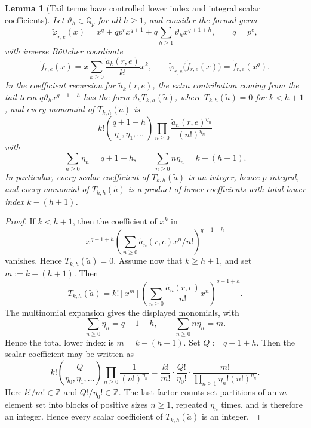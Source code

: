 \documentclass[11pt]{amsart}
\numberwithin{equation}{section}
\newtheorem{lemma}[lemma]{Lemma}
\newcommand{\Qp}{\mathbb{Q}_p}
\begin{document}
\begin{lemma}[Tail terms have controlled lower index and integral scalar coefficients]\label{lem:tail-structure}
Let $\vartheta_h\in\Qp$ for all $h\ge1$, and consider the formal germ
\[
        \widetilde\varphi_{r,e}(x)=x^q+qp^r x^{q+1}+q\sum_{h\ge1}\vartheta_h x^{q+1+h},
        \qquad q=p^e,
\]
with inverse B\"ottcher coordinate
\[
        \widetilde f_{r,e}(x)=x\sum_{k\ge0}\frac{\widetilde a_k(r,e)}{k!}x^k,
        \qquad
        \widetilde\varphi_{r,e}\bigl(\widetilde f_{r,e}(x)\bigr)=\widetilde f_{r,e}(x^q).
\]
In the coefficient recursion for $\widetilde a_k(r,e)$, the extra contribution coming from the tail term $q\vartheta_hx^{q+1+h}$ has the form $\vartheta_hT_{k,h}(\widetilde a)$, where $T_{k,h}(\widetilde a)=0$ for $k<h+1$, and every monomial of $T_{k,h}(\widetilde a)$ is
\[
        k!\binom{q+1+h}{\eta_0,\eta_1,\ldots}
        \prod_{n\ge0}\frac{\widetilde a_n(r,e)^{\eta_n}}{(n!)^{\eta_n}}
\]
with
\[
        \sum_{n\ge0}\eta_n=q+1+h,
        \qquad
        \sum_{n\ge0}n\eta_n=k-(h+1).
\]
In particular, every scalar coefficient of $T_{k,h}(\widetilde a)$ is an integer, hence $p$-integral, and every monomial of $T_{k,h}(\widetilde a)$ is a product of lower coefficients with total lower index $k-(h+1)$.
\end{lemma}
\begin{proof}
If $k<h+1$, then the coefficient of $x^k$ in
\[
        x^{q+1+h}\left(\sum_{n\ge0}\widetilde a_n(r,e)x^n/n!\right)^{q+1+h}
\]
vanishes.  Hence $T_{k,h}(\widetilde a)=0$.  Assume now that $k\ge h+1$, and set $m:=k-(h+1)$.  Then
\[
        T_{k,h}(\widetilde a)=k![x^m]\left(\sum_{n\ge0}\frac{\widetilde a_n(r,e)}{n!}x^n\right)^{q+1+h}.
\]
The multinomial expansion gives the displayed monomials, with
\[
        \sum_{n\ge0}\eta_n=q+1+h,
        \qquad
        \sum_{n\ge0}n\eta_n=m.
\]
Hence the total lower index is $m=k-(h+1)$.  Set $Q:=q+1+h$.  Then the scalar coefficient may be written as
\[
        k!\binom{Q}{\eta_0,\eta_1,\ldots}\prod_{n\ge0}\frac1{(n!)^{\eta_n}}
        =\frac{k!}{m!}\cdot \frac{Q!}{\eta_0!}\cdot
        \frac{m!}{\prod_{n\ge1}\eta_n!(n!)^{\eta_n}}.
\]
Here $k!/m!\in\mathbb Z$ and $Q!/\eta_0!\in\mathbb Z$.  The last factor counts set partitions of an $m$-element set into blocks of positive sizes $n\ge1$, repeated $\eta_n$ times, and is therefore an integer.  Hence every scalar coefficient of $T_{k,h}(\widetilde a)$ is an integer.
\end{proof}
\end{document}
